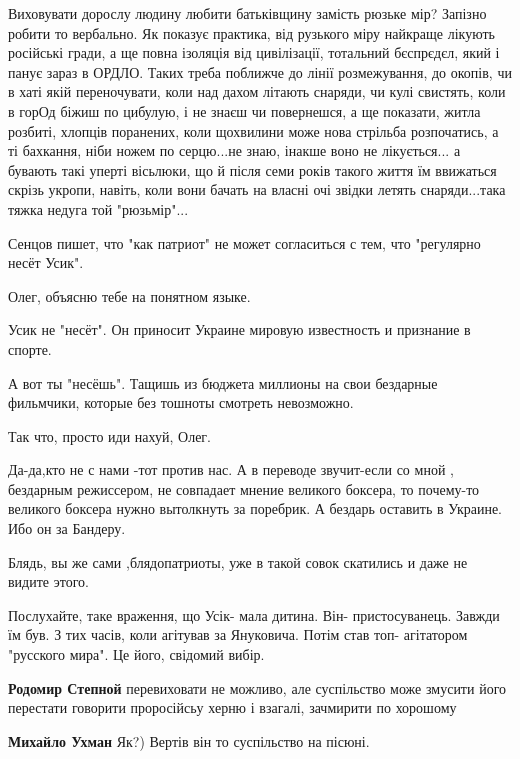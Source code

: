 \begin{itemize}
Виховувати дорослу людину любити батьківщину замість рюзьке мір? Запізно робити
то вербально. Як показує практика, від рузького міру найкраще лікують російські
гради, а ще повна ізоляція від цивілізації, тотальний бєспрєдєл, який і панує
зараз в ОРДЛО. Таких треба поближче до лінії розмежування, до окопів, чи в хаті
якій переночувати, коли над дахом літають снаряди, чи кулі свистять, коли в
горОд біжиш по цибулую, і не знаєш чи повернешся, а ще показати, житла розбиті,
хлопців поранених, коли щохвилини може нова стрільба розпочатись, а ті
бахкання, ніби ножем по серцю...не знаю, інакше воно не лікується... а бувають
такі уперті вісьлюки, що й після семи років такого життя їм ввижаться скрізь
укропи, навіть, коли вони бачать на власні очі звідки летять снаряди...така
тяжка недуга той "рюзьмір"...



Сенцов пишет, что "как патриот" не может согласиться с тем, что "регулярно несёт Усик".

Олег, объясню тебе на понятном языке.

Усик не "несёт". Он приносит Украине мировую известность и признание в спорте.

А вот ты "несёшь". Тащишь из бюджета миллионы на свои бездарные фильмчики, которые без тошноты смотреть невозможно.

Так что, просто иди нахуй, Олег.


Да-да,кто не с нами -тот против нас. А в переводе звучит-если со мной ,
бездарным режиссером, не совпадает мнение великого боксера, то почему-то
великого боксера нужно вытолкнуть за поребрик. А бездарь оставить в Украине.
Ибо он за Бандеру.

Блядь, вы же сами ,блядопатриоты, уже в такой совок скатились и даже не видите
этого.



Послухайте, таке враження, що Усік- мала дитина. Він- пристосуванець. Завжди їм
був. З тих часів, коли агітував за Януковича. Потім став топ- агітатором
"русского мира". Це його, свідомий вибір.

\begin{itemize} %
\textbf{Родомир Степной} перевиховати не можливо, але суспільство може змусити його перестати говорити проросійсьу херню і взагалі, зачмирити по хорошому

\textbf{Михайло Ухман} Як?) Вертів він то суспільство на пісюні.


\end{itemize}
\end{itemize}
